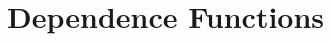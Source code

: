 \documentclass[11pt,a4paper]{article}
\begin{document}
%
%
%
%
%
%
%
%

\section{Dependence Functions}
\setcounter{footnote}{0}
\label{depfun}
\end{document}
